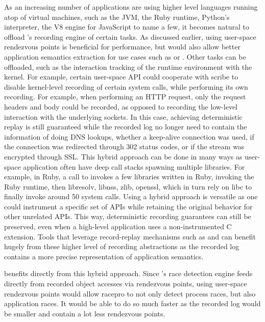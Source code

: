 As an increasing number of applications are using higher level languages running
atop of virtual machines, such as the JVM, the Ruby runtime, Python's interpreter,
the V8 engine for JavaScript to name a few, it becomes natural to offload \scribe's
recording engine of certain tasks. As discussed earlier, using user-space
rendezvous points is beneficial for performance, but would also allow
better application semantics extraction for use cases such as \racepro or \dora.
Other tasks can be offloaded, such as the interaction tracking of the runtime
environment with the kernel. For example, certain user-space API could cooperate
with scribe to disable kernel-level recording of certain system calls, while performing
its own recording. For example, when performing an HTTP request, only the request
headers and body could be recorded, as opposed to recording the low-level
interaction with the underlying sockets. In this case, achieving deterministic
replay is still guaranteed while the recorded log no longer need to contain the
information of doing DNS lookups, whether a keep-alive connection was used, if
the connection was redirected through 302 status codes, or if the stream was
encrypted through SSL.
This hybrid approach can be done in many ways as user-space application often
have deep call stacks spawning multiple libraries. For example, in Ruby, a call
to  invokes a few libraries written
in Ruby, invoking the Ruby runtime, then libresolv, libnss, zlib, openssl, which
in turn rely on libc to finally invoke around 50 system calls.
Using a hybrid approach is versatile as one could instrument a specific set of APIs
while retaining the original \scribe behavior for other unrelated APIs. This way,
deterministic recording guarantees can still be preserved, even when a high-level
application uses a non-instrumented C extension.
Tools that leverage record-replay mechanisms such as \dora and \racepro can
benefit hugely from these higher level of recording abstractions as the
recorded log contains a more precise representation of application semantics.

\racepro benefits directly from this hybrid approach. Since \racepro's race
detection engine feeds directly from recorded object accesses via rendezvous points,
using user-space rendezvous points would allow racepro to not only detect process
races, but also application races. It would be able to do so much faster
as the recorded log would be smaller and contain a lot less rendezvous points.

